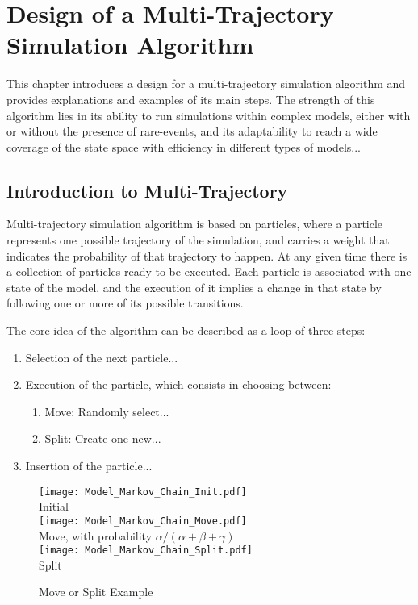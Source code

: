 
\chapter{Design of a Multi-Trajectory Simulation Algorithm} 
\label{ch:Multi-Trajectory Simulation Algorithm}
This chapter introduces a design for a multi-trajectory simulation algorithm and provides explanations and examples of its main steps. The strength of this algorithm lies in its ability to run simulations within complex models, either with or without the presence of rare-events, and its adaptability to reach a wide coverage of the state space with efficiency in different types of models...

\section{Introduction to Multi-Trajectory}
\label{sec:Introduction to Multi-Trajectory}
Multi-trajectory simulation algorithm is based on particles, where a particle represents one possible trajectory of the simulation, and carries a weight that indicates the probability of that trajectory to happen. At any given time there is a collection of particles ready to be executed. Each particle is associated with one state of the model, and the execution of it implies a change in that state by following one or more of its possible transitions. 

The core idea of the algorithm can be described as a loop of three steps:
\begin{enumerate}
  \item Selection of the next particle...
  \item Execution of the particle, which consists in choosing between:
  \begin{enumerate}
    \item Move: Randomly select...
    \item Split: Create one new...
  \end{enumerate}
  \item Insertion of the particle...
\end{enumerate}


\begin{figure}[htb]
\begin{multicols}{3}
\centering
\texttt{[image: Model\_Markov\_Chain\_Init.pdf]}\\
Initial\\
\texttt{[image: Model\_Markov\_Chain\_Move.pdf]}\\
Move, with probability $\alpha/(\alpha+\beta+\gamma)$\\
\texttt{[image: Model\_Markov\_Chain\_Split.pdf]}\\
Split\\
\end{multicols}
\caption{Move or Split Example}
\label{fig:Move or Split Example}
\end{figure}


